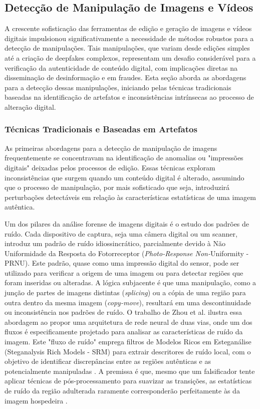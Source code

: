 \subsection{Detecção de Manipulação de Imagens e Vídeos}
\label{detecção de manipulação de imagens e vídeos}
A crescente sofisticação das ferramentas de edição e geração de imagens e vídeos digitais impulsionou significativamente a necessidade de métodos robustos para a detecção de manipulações. Tais manipulações, que variam desde edições simples até a criação de deepfakes complexos, representam um desafio considerável para a verificação da autenticidade de conteúdo digital, com implicações diretas na disseminação de desinformação e em fraudes. Esta seção aborda as abordagens para a detecção dessas manipulações, iniciando pelas técnicas tradicionais baseadas na identificação de artefatos e inconsistências intrínsecas ao processo de alteração digital.

\subsubsection{Técnicas Tradicionais e Baseadas em Artefatos}

As primeiras abordagens para a detecção de manipulação de imagens frequentemente se concentravam na identificação de anomalias ou "impressões digitais" deixadas pelos processos de edição. Essas técnicas exploram inconsistências que surgem quando um conteúdo digital é alterado, assumindo que o processo de manipulação, por mais sofisticado que seja, introduzirá perturbações detectáveis em relação às características estatísticas de uma imagem autêntica.


Um dos pilares da análise forense de imagens digitais é o estudo dos padrões de ruído. Cada dispositivo de captura, seja uma câmera digital ou um scanner, introduz um padrão de ruído idiossincrático, parcialmente devido à Não Uniformidade da Resposta do Fotorreceptor (\textit{Photo-Response Non-}Uniformity - PRNU). Este padrão, quase como uma impressão digital do sensor, pode ser utilizado para verificar a origem de uma imagem ou para detectar regiões que foram inseridas ou alteradas. A lógica subjacente é que uma manipulação, como a junção de partes de imagens distintas (\textit{splicing}) ou a cópia de uma região para outra dentro da mesma imagem (\textit{copy-move}), resultará em uma descontinuidade ou inconsistência nos padrões de ruído. O trabalho de Zhou et al. \cite{zhou2018manipulation} ilustra essa abordagem ao propor uma arquitetura de rede neural de duas vias, onde um dos fluxos é especificamente projetado para analisar as características de ruído da imagem. Este "fluxo de ruído" emprega filtros de Modelos Ricos em Esteganálise (Steganalysis Rich Models - SRM) para extrair descritores de ruído local, com o objetivo de identificar discrepâncias entre as regiões autênticas e as potencialmente manipuladas \cite{zhou2018manipulation}. A premissa é que, mesmo que um falsificador tente aplicar técnicas de pós-processamento para suavizar as transições, as estatísticas de ruído da região adulterada raramente corresponderão perfeitamente às da imagem hospedeira \cite{zhou2018manipulation}.

